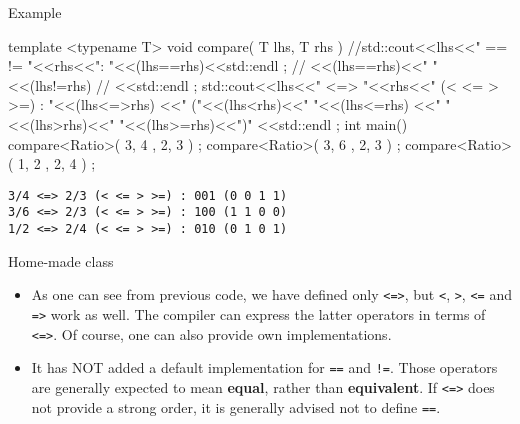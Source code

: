 \begin{frame}[fragile]
  \scriptsize
  \begin{exampleblock}{Example}
    \begin{cppcode*}{}
    template <typename T>
    void compare( T lhs, T rhs )
    {
      //std::cout<<lhs<<" == != "<<rhs<<": "<<(lhs==rhs)<<std::endl ;
      //  <<(lhs==rhs)<<" "<<(lhs!=rhs)
      //  <<std::endl ;
      std::cout<<lhs<<" <=> "<<rhs<<" (< <= > >=) : "<<(lhs<=>rhs)
        <<" ("<<(lhs<rhs)<<" "<<(lhs<=rhs)
        <<" "<<(lhs>rhs)<<" "<<(lhs>=rhs)<<")"
        <<std::endl ;
    }
    int main()
    {
      compare<Ratio>({ 3, 4 },{ 2, 3 }) ;
      compare<Ratio>({ 3, 6 },{ 2, 3 }) ;
      compare<Ratio>({ 1, 2 },{ 2, 4 }) ;
    }
     \end{cppcode*}
  \end{exampleblock}
  \begin{Verbatim}
3/4 <=> 2/3 (< <= > >=) : 001 (0 0 1 1)
3/6 <=> 2/3 (< <= > >=) : 100 (1 1 0 0)
1/2 <=> 2/4 (< <= > >=) : 010 (0 1 0 1)
  \end{Verbatim}
\end{frame}

\begin{frame}[fragile]
  \begin{block}{Home-made class}
    \begin{itemize}
      \item As one can see from previous code, we have defined only \texttt{<=>}, but \texttt{<}, \texttt{>}, \texttt{<=} and \texttt{=>} work as well. The compiler can express the latter operators in terms of \texttt{<=>}. Of course, one can also provide own implementations.
      \item It has NOT added a default implementation for \texttt{==} and \texttt{!=}. Those operators are generally expected to mean \textbf{equal}, rather than \textbf{equivalent}. If \texttt{<=>} does not provide a strong order, it is generally advised not to define \texttt{==}.
    \end{itemize}
  \end{block}
\end{frame}

